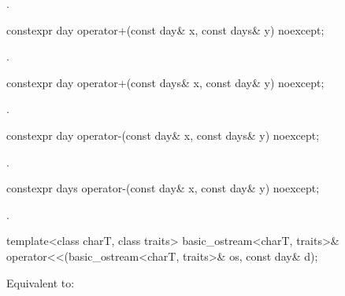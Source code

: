 \begin{itemdescr}
\pnum
\returns
{}.
\end{itemdescr}

%
\begin{itemdecl}
constexpr day operator+(const day& x, const days& y) noexcept;
\end{itemdecl}

\begin{itemdescr}
\pnum
\returns
{}.
\end{itemdescr}

%
\begin{itemdecl}
constexpr day operator+(const days& x, const day& y) noexcept;
\end{itemdecl}

\begin{itemdescr}
\pnum
\returns
{}.
\end{itemdescr}

%
\begin{itemdecl}
constexpr day operator-(const day& x, const days& y) noexcept;
\end{itemdecl}

\begin{itemdescr}
\pnum
\returns
{}.
\end{itemdescr}

%
\begin{itemdecl}
constexpr days operator-(const day& x, const day& y) noexcept;
\end{itemdecl}

\begin{itemdescr}
\pnum
\returns
{}.
\end{itemdescr}

%
\begin{itemdecl}
template<class charT, class traits>
  basic_ostream<charT, traits>&
    operator<<(basic_ostream<charT, traits>& os, const day& d);
\end{itemdecl}

\begin{itemdescr}
\pnum
\effects
Equivalent to:
\end{itemdescr}

